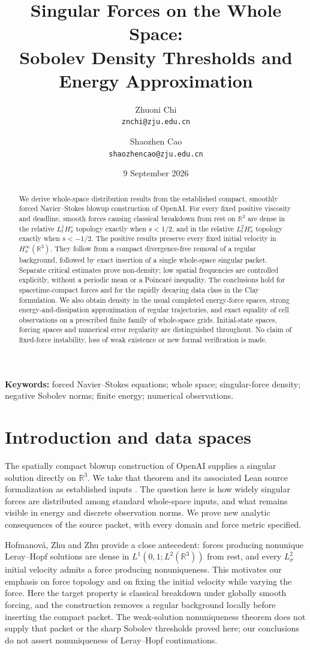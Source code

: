 \documentclass[11pt,a4paper]{article}
\title{Singular Forces on the Whole Space:\\ Sobolev Density Thresholds and Energy Approximation}
\author{Zhuoni Chi\\\texttt{znchi@zju.edu.cn}\and Shaozhen Cao\\\texttt{shaozhencao@zju.edu.cn}}
\date{9 September 2026}
\theoremstyle{definition}\newtheorem{definition}[theorem]{Definition}
\theoremstyle{remark}\newtheorem{remark}[theorem]{Remark}
\newcommand{\R}{\mathbb R}\newcommand{\TT}{\mathbb T^3}
\begin{document}
\maketitle
\begin{abstract}
We derive whole-space distribution results from the established compact, smoothly forced Navier--Stokes blowup construction of OpenAI. For every fixed positive viscosity and deadline, smooth forces causing classical breakdown from rest on $\mathbb R^3$ are dense in the relative $L^1_tH^s_x$ topology exactly when $s<1/2$, and in the relative $L^2_tH^s_x$ topology exactly when $s<-1/2$. The positive results preserve every fixed initial velocity in $H^\infty_\sigma(\R^3)$. They follow from a compact divergence-free removal of a regular background, followed by exact insertion of a single whole-space singular packet. Separate critical estimates prove non-density; low spatial frequencies are controlled explicitly, without a periodic mean or a Poincar\'e inequality. The conclusions hold for spacetime-compact forces and for the rapidly decaying data class in the Clay formulation. We also obtain density in the usual completed energy-force spaces, strong energy-and-dissipation approximation of regular trajectories, and exact equality of cell observations on a prescribed finite family of whole-space grids. Initial-state spaces, forcing spaces and numerical error regularity are distinguished throughout. No claim of fixed-force instability, loss of weak existence or new formal verification is made.
\end{abstract}
\noindent\textbf{Keywords:} forced Navier--Stokes equations; whole space; singular-force density; negative Sobolev norms; finite energy; numerical observations.

\section{Introduction and data spaces}\label{sec:whole}
The spatially compact blowup construction of OpenAI supplies a singular solution directly on $\R^3$. We take that theorem and its associated Lean source formalization as established inputs \cite{openai,lean}. The question here is how widely singular forces are distributed among standard whole-space inputs, and what remains visible in energy and discrete observation norms. We prove new analytic consequences of the source packet, with every domain and force metric specified.

Hofmanov\'a, Zhu and Zhu \cite[Theorem~1.4, Corollary~4.6 and Theorem~5.1]{hzz2024} provide a close antecedent: forces producing nonunique Leray--Hopf solutions are dense in $L^1(0,1;L^2(\R^3))$ from rest, and every $L^2_\sigma$ initial velocity admits a force producing nonuniqueness. This motivates our emphasis on force topology and on fixing the initial velocity while varying the force. Here the target property is classical breakdown under globally smooth forcing, and the construction removes a regular background locally before inserting the compact packet. The weak-solution nonuniqueness theorem does not supply that packet or the sharp Sobolev thresholds proved here; our conclusions do not assert nonuniqueness of Leray--Hopf continuations.
\end{document}
